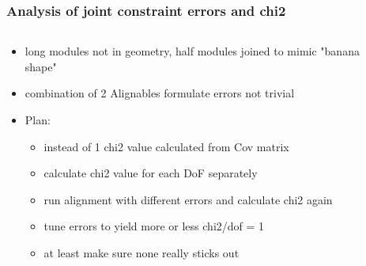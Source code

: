 \documentclass[aspectratio=1610, 12pt]{beamer}
\begin{document}
\begin{frame}\frametitle{Analysis of joint constraint errors and chi2}
  \begin{columns}
    \begin{column}[c]{0.7\textwidth}
      \begin{itemize}
        \item long modules not in geometry, half modules joined to mimic "banana shape"
        \item combination of 2 Alignables \to formulate errors not trivial
        \item Plan:
        \begin{itemize}
          \item instead of 1 chi2 value calculated from Cov matrix
          \item \to calculate chi2 value for each DoF separately
          \item run alignment with different errors and calculate chi2 again
          \item \to tune errors to yield more or less chi2/dof = 1
          \item at least make sure none really sticks out
        \end{itemize}
      \end{itemize}
    \end{column}
    \begin{column}[c]{0.3\textwidth}
    \end{column}
  \end{columns}
\end{frame}
\end{document}
